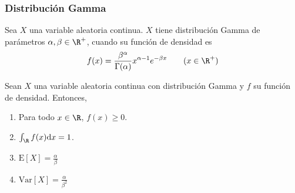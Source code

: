 \subsubsection{Distribución Gamma}
\begin{Def}
  Sea $X$ una variable aleatoria continua. $X$ tiene distribución Gamma
  de parámetros $\alpha,\beta\in\R^+$, cuando su función de densidad es
  \[
    f(x)=\frac{\beta^{\alpha}}{\Gamma(\alpha)}x^{\alpha-1}e^{-\beta x}
    \qquad (x\in\R^+)
  \]
\end{Def}
\begin{Teo}
  Sean $X$ una variable aleatoria continua con distribución Gamma y $f$
  su función de densidad. Entonces,
  \begin{enumerate}
    \item Para todo $x\in\R$, $f(x) \geq 0$.
    \item $\int_{\R}f(x)\mathrm{d}x=1$.
    \item $\text{E}[X]=\frac{\alpha}{\beta}$
    \item $\text{Var}[X]=\frac{\alpha}{\beta^2}$
  \end{enumerate}
\end{Teo}
